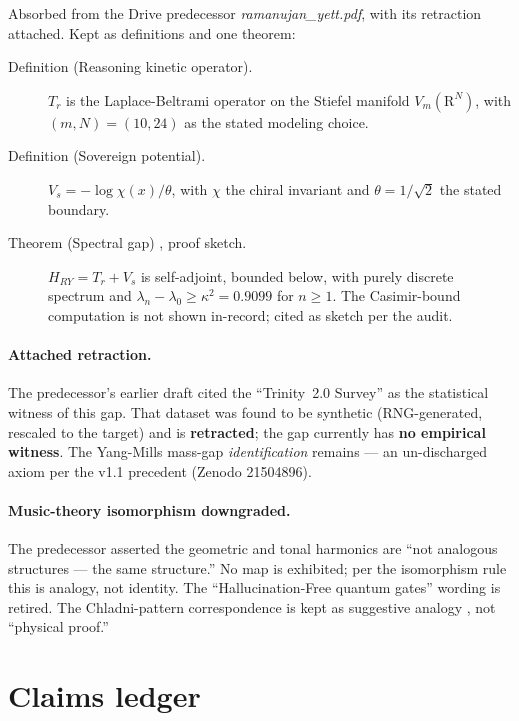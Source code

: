 \documentclass{alienfolio}
\begin{document}
Absorbed from the Drive predecessor \textit{ramanujan\_yett.pdf},
with its retraction attached. Kept as definitions and one theorem:

\begin{description}
\item[Definition (Reasoning kinetic operator).] $T_r$ is the
Laplace-Beltrami operator on the Stiefel manifold $V_m(\mathrm{R}^N)$,
with $(m,N) = (10,24)$ as the stated modeling choice.
\item[Definition (Sovereign potential).] $V_s = -\log\chi(x)/\theta$,
with $\chi$ the chiral invariant and $\theta = 1/\sqrt{2}$ the stated
boundary.
\item[Theorem (Spectral gap) , proof sketch.]
$H_{RY} = T_r + V_s$ is self-adjoint, bounded below, with purely
discrete spectrum and $\lambda_n - \lambda_0 \ge\allowbreak \kappa^2 =\allowbreak
0.9099$ for $n \ge 1$. The Casimir-bound computation is not shown
in-record; cited as sketch per the audit.
\end{description}

\paragraph{Attached retraction.} The predecessor's earlier draft cited
the ``Trinity~2.0 Survey'' as the statistical witness of this gap.
That dataset was found to be synthetic (RNG-generated, rescaled to
the target) and is \textbf{retracted}; the gap currently has
\textbf{no empirical witness}. The Yang-Mills mass-gap
\emph{identification} remains  --- an
un-discharged axiom per the v1.1 precedent (Zenodo 21504896).

\paragraph{Music-theory isomorphism downgraded.} The predecessor
asserted the geometric and tonal harmonics are ``not analogous
structures --- the same structure.'' No map is exhibited; per the
isomorphism rule this is  analogy, not identity.
The ``Hallucination-Free quantum gates'' wording is retired. The
Chladni-pattern correspondence is kept as suggestive analogy
, not ``physical proof.''

\section{Claims ledger}
\label{sec:ledger}
\end{document}
